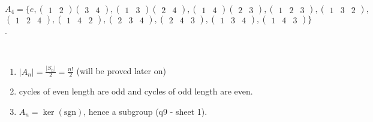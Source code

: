 \begin{example}
$A_4 = \bigg\{ e, \begin{pmatrix}1 & 2\end{pmatrix} \begin{pmatrix}3 & 4\end{pmatrix}, \begin{pmatrix}1 & 3\end{pmatrix} \begin{pmatrix}2 & 4\end{pmatrix}, \begin{pmatrix}1 & 4\end{pmatrix} \begin{pmatrix}2 & 3\end{pmatrix},\begin{pmatrix}1 & 2 & 3\end{pmatrix}, \begin{pmatrix}1 & 3 & 2\end{pmatrix},$ \\
$\begin{pmatrix}1 & 2 & 4\end{pmatrix}, \begin{pmatrix}1 & 4 & 2\end{pmatrix},\begin{pmatrix}2 & 3 & 4\end{pmatrix}, \begin{pmatrix}2 & 4 & 3\end{pmatrix}, \begin{pmatrix}1 & 3 & 4\end{pmatrix}, \begin{pmatrix}1 & 4 & 3\end{pmatrix} \bigg\}$.
\end{example}

\begin{remark} ~
  \begin{enumerate}
  \def\labelenumi{\roman{enumi}.}
  \item
    $|A_n| = \frac{|S_n|}{2} = \frac{n!}{2}$ (will be proved later on)
  \item
    cycles of even length are odd and cycles of odd length are even.
  \item
    $A_n = \ker (\text{sgn})$, hence a subgroup (q9 - sheet 1).
  \end{enumerate}
\end{remark}